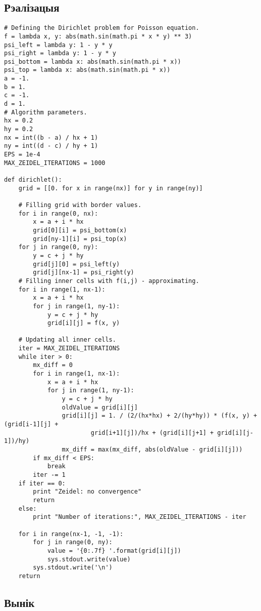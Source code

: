 \subsection*{Рэалізацыя}
{\small
\begin{verbatim}
# Defining the Dirichlet problem for Poisson equation.
f = lambda x, y: abs(math.sin(math.pi * x * y) ** 3)
psi_left = lambda y: 1 - y * y
psi_right = lambda y: 1 - y * y
psi_bottom = lambda x: abs(math.sin(math.pi * x))
psi_top = lambda x: abs(math.sin(math.pi * x))
a = -1.
b = 1.
c = -1.
d = 1.
# Algorithm parameters.
hx = 0.2
hy = 0.2
nx = int((b - a) / hx + 1)
ny = int((d - c) / hy + 1)
EPS = 1e-4
MAX_ZEIDEL_ITERATIONS = 1000

def dirichlet():
    grid = [[0. for x in range(nx)] for y in range(ny)]

    # Filling grid with border values.
    for i in range(0, nx):
        x = a + i * hx
        grid[0][i] = psi_bottom(x)
        grid[ny-1][i] = psi_top(x)
    for j in range(0, ny):
        y = c + j * hy
        grid[j][0] = psi_left(y)
        grid[j][nx-1] = psi_right(y)
    # Filling inner cells with f(i,j) - approximating.
    for i in range(1, nx-1):
        x = a + i * hx
        for j in range(1, ny-1):
            y = c + j * hy
            grid[i][j] = f(x, y)

    # Updating all inner cells.
    iter = MAX_ZEIDEL_ITERATIONS
    while iter > 0:
        mx_diff = 0
        for i in range(1, nx-1):
            x = a + i * hx
            for j in range(1, ny-1):
                y = c + j * hy
                oldValue = grid[i][j]
                grid[i][j] = 1. / (2/(hx*hx) + 2/(hy*hy)) * (f(x, y) + (grid[i-1][j] +
                        grid[i+1][j])/hx + (grid[i][j+1] + grid[i][j-1])/hy)
                mx_diff = max(mx_diff, abs(oldValue - grid[i][j]))
        if mx_diff < EPS:
            break
        iter -= 1
    if iter == 0:
        print "Zeidel: no convergence"
        return
    else:
        print "Number of iterations:", MAX_ZEIDEL_ITERATIONS - iter

    for i in range(nx-1, -1, -1):
        for j in range(0, ny):
            value = '{0:.7f} '.format(grid[i][j])
            sys.stdout.write(value)
        sys.stdout.write('\n')
    return
\end{verbatim}
}


\subsection*{Вынік}

